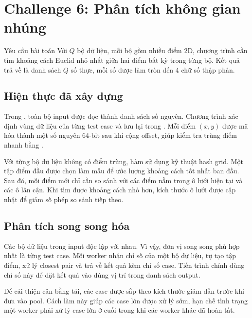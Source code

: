 \section{Challenge 6: Phân tích không gian nhúng}
\label{sec:challenge6}

\begin{requirementbox}{Yêu cầu bài toán}
Với $Q$ bộ dữ liệu, mỗi bộ gồm nhiều điểm 2D, chương trình cần tìm khoảng cách Euclid nhỏ nhất giữa hai điểm bất kỳ trong từng bộ. Kết quả trả về là danh sách $Q$ số thực, mỗi số được làm tròn đến 4 chữ số thập phân.
\end{requirementbox}

\subsection{Hiện thực đã xây dựng}
Trong , toàn bộ input được đọc thành danh sách số nguyên. Chương trình xác định vùng dữ liệu của từng test case và lưu lại trong . Mỗi điểm $(x,y)$ được mã hóa thành một số nguyên 64-bit sau khi cộng offset, giúp kiểm tra trùng điểm nhanh bằng .

Với từng bộ dữ liệu không có điểm trùng, hàm  sử dụng kỹ thuật hash grid. Một tập điểm đầu được chọn làm mẫu để ước lượng khoảng cách tốt nhất ban đầu. Sau đó, mỗi điểm mới chỉ cần so sánh với các điểm nằm trong ô lưới hiện tại và các ô lân cận. Khi tìm được khoảng cách nhỏ hơn, kích thước ô lưới được cập nhật để giảm số phép so sánh tiếp theo.

\subsection{Phân tích song song hóa}
Các bộ dữ liệu trong input độc lập với nhau. Vì vậy, đơn vị song song phù hợp nhất là từng test case. Mỗi worker nhận chỉ số của một bộ dữ liệu, tự tạo tập điểm, xử lý closest pair và trả về kết quả kèm chỉ số case. Tiến trình chính dùng chỉ số này để đặt kết quả vào đúng vị trí trong danh sách output.

Để cải thiện cân bằng tải, các case được sắp theo kích thước giảm dần trước khi đưa vào pool. Cách làm này giúp các case lớn được xử lý sớm, hạn chế tình trạng một worker phải xử lý case lớn ở cuối trong khi các worker khác đã hoàn tất.

